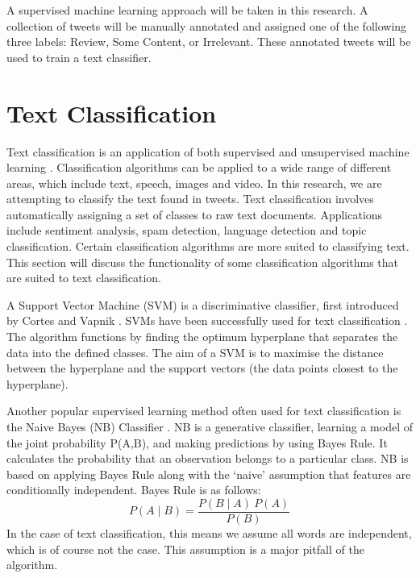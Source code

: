 A supervised machine learning approach will be taken in this research. A collection of tweets will be manually annotated and assigned one of the following three labels: Review, Some Content, or Irrelevant. These annotated tweets will be used to train a text classifier. 

\section{Text Classification}

Text classification is an application of both supervised and unsupervised machine learning \cite{khan2010}. Classification algorithms can be applied to a wide range of different areas, which include text, speech, images and video. In this research, we are attempting to classify the text found in tweets. Text classification involves automatically assigning a set of classes to raw text documents. Applications include sentiment analysis, spam detection, language detection and topic classification. Certain classification algorithms are more suited to classifying text. This section will discuss the functionality of some classification algorithms that are suited to text classification. 



A Support Vector Machine (SVM) is a discriminative classifier, first introduced by Cortes and Vapnik \cite{Vapnik1995,  Vapnik21995}. SVMs have been successfully used for text classification \cite{Joachims1998, tong2001support}. The algorithm functions by finding the optimum hyperplane that separates the data into the defined classes. The aim of a SVM is to maximise the distance between the hyperplane and the support vectors (the data points closest to the hyperplane). 

Another popular supervised learning method often used for text classification is the Naive Bayes (NB) Classifier  \cite{NaiveBayes1998}. NB is a generative classifier, learning a model of the joint probability P(A,B), and making predictions by using Bayes Rule. It calculates the probability that an observation belongs to a particular class. NB is based on applying Bayes Rule along with the ‘naive’ assumption that features are conditionally independent. Bayes Rule is as follows:
\begin{equation}
    P(A\mid B) = \frac{P(B\mid A)\:P(A)}{P(B)}
\end{equation}
In the case of text classification, this means we assume all words are independent, which is of course not the case. This assumption is a major pitfall of the algorithm. 

